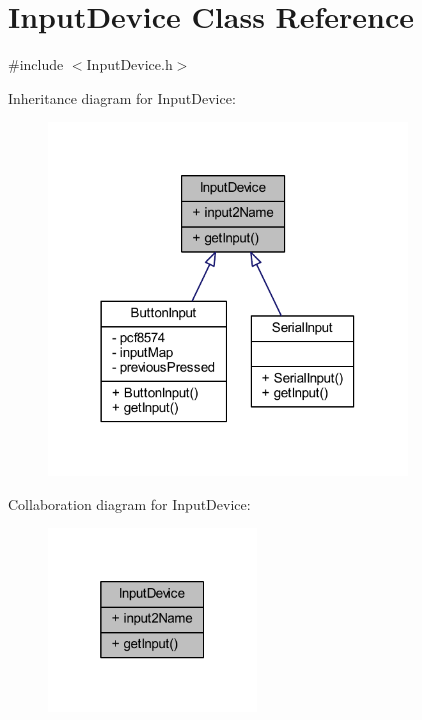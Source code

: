 \hypertarget{class_input_device}{}\section{Input\+Device Class Reference}
\label{class_input_device}


{\ttfamily \#include $<$Input\+Device.\+h$>$}



Inheritance diagram for Input\+Device\+:
\nopagebreak
\begin{figure}[H]
\begin{center}
\leavevmode
\includegraphics[width=270pt]{class_input_device__inherit__graph}
\end{center}
\end{figure}


Collaboration diagram for Input\+Device\+:
\nopagebreak
\begin{figure}[H]
\begin{center}
\leavevmode
\includegraphics[width=157pt]{class_input_device__coll__graph}
\end{center}
\end{figure}
